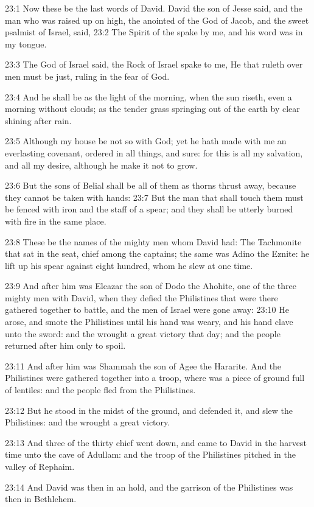 23:1 Now these be the last words of David. David the son of Jesse
said, and the man who was raised up on high, the anointed of the God
of Jacob, and the sweet psalmist of Israel, said, 23:2 The Spirit of
the \LORD spake by me, and his word was in my tongue.

23:3 The God of Israel said, the Rock of Israel spake to me, He that
ruleth over men must be just, ruling in the fear of God.

23:4 And he shall be as the light of the morning, when the sun riseth,
even a morning without clouds; as the tender grass springing out of
the earth by clear shining after rain.

23:5 Although my house be not so with God; yet he hath made with me an
everlasting covenant, ordered in all things, and sure: for this is all
my salvation, and all my desire, although he make it not to grow.

23:6 But the sons of Belial shall be all of them as thorns thrust
away, because they cannot be taken with hands: 23:7 But the man that
shall touch them must be fenced with iron and the staff of a spear;
and they shall be utterly burned with fire in the same place.

23:8 These be the names of the mighty men whom David had: The
Tachmonite that sat in the seat, chief among the captains; the same
was Adino the Eznite: he lift up his spear against eight hundred, whom
he slew at one time.

23:9 And after him was Eleazar the son of Dodo the Ahohite, one of the
three mighty men with David, when they defied the Philistines that
were there gathered together to battle, and the men of Israel were
gone away: 23:10 He arose, and smote the Philistines until his hand
was weary, and his hand clave unto the sword: and the \LORD wrought a
great victory that day; and the people returned after him only to
spoil.

23:11 And after him was Shammah the son of Agee the Hararite. And the
Philistines were gathered together into a troop, where was a piece of
ground full of lentiles: and the people fled from the Philistines.

23:12 But he stood in the midst of the ground, and defended it, and
slew the Philistines: and the \LORD wrought a great victory.

23:13 And three of the thirty chief went down, and came to David in
the harvest time unto the cave of Adullam: and the troop of the
Philistines pitched in the valley of Rephaim.

23:14 And David was then in an hold, and the garrison of the
Philistines was then in Bethlehem.

